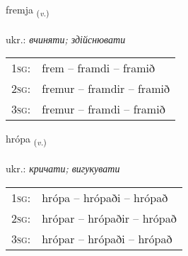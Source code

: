 \documentclass[frontgrid, backgrid]{flacards}\usepackage[]{graphicx}\usepackage[]{xcolor}
\begin{document}
\renewcommand{\flhead}{\vskip5pt \fboxsep=0pt {\small\bfseries\footnotesize Sagnorð | дієслово}}
\renewcommand{\fcfoot}{\vskip5pt \fboxsep=0pt \hspace{2pt}{\small\bfseries\footnotesize 3K}}

\renewcommand{\blhead}{\vskip5pt {\small\bfseries\footnotesize Sagnorð | дієслово }}
\renewcommand{\bcfoot}{\vskip5pt \hspace{2pt}{\small\bfseries\footnotesize 3K}}


{fremja \small{\textsubscript{(\textit{v.})}} \\[1ex] %
\textphonetic{[frɛmja]} \\
ukr.: \emph{вчиняти; здійснювати} \\  [2ex]
\renewcommand*{\arraystretch}{0.8}
\begin{tabular}{p{1cm}l}
\textsc{1sg}: & frem -- framdi -- framið \\ 
\textsc{2sg}: & fremur -- framdir -- framið \\ 
\textsc{3sg}: & fremur -- framdi -- framið \\ 
\end{tabular}
}

\renewcommand{\flhead}{\vskip5pt \fboxsep=0pt {\small\bfseries\footnotesize Sagnorð | дієслово}}
\renewcommand{\fcfoot}{\vskip5pt \fboxsep=0pt \hspace{2pt}{\small\bfseries\footnotesize 3K}}

\renewcommand{\blhead}{\vskip5pt {\small\bfseries\footnotesize Sagnorð | дієслово }}
\renewcommand{\bcfoot}{\vskip5pt \hspace{2pt}{\small\bfseries\footnotesize 3K}}


{hrópa \small{\textsubscript{(\textit{v.})}} \\[1ex] %
\textphonetic{[r̥ouːpa]} \\
ukr.: \emph{кричати; вигукувати} \\  [2ex]
\renewcommand*{\arraystretch}{0.8}
\begin{tabular}{p{1cm}l}
\textsc{1sg}: & hrópa -- hrópaði -- hrópað \\ 
\textsc{2sg}: & hrópar -- hrópaðir -- hrópað \\ 
\textsc{3sg}: & hrópar -- hrópaði -- hrópað \\ 
\end{tabular}
}
\end{document}
